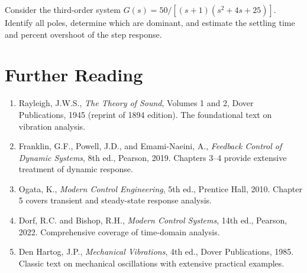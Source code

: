 \begin{exercise}
Consider the third-order system $G(s) = 50/[(s+1)(s^2+4s+25)]$. Identify all poles, determine which are dominant, and estimate the settling time and percent overshoot of the step response.
\end{exercise}

\section{Further Reading}

\begin{enumerate}
    \item Rayleigh, J.W.S., \textit{The Theory of Sound}, Volumes 1 and 2, Dover Publications, 1945 (reprint of 1894 edition). The foundational text on vibration analysis.

    \item Franklin, G.F., Powell, J.D., and Emami-Naeini, A., \textit{Feedback Control of Dynamic Systems}, 8th ed., Pearson, 2019. Chapters 3--4 provide extensive treatment of dynamic response.

    \item Ogata, K., \textit{Modern Control Engineering}, 5th ed., Prentice Hall, 2010. Chapter 5 covers transient and steady-state response analysis.

    \item Dorf, R.C. and Bishop, R.H., \textit{Modern Control Systems}, 14th ed., Pearson, 2022. Comprehensive coverage of time-domain analysis.

    \item Den Hartog, J.P., \textit{Mechanical Vibrations}, 4th ed., Dover Publications, 1985. Classic text on mechanical oscillations with extensive practical examples.
\end{enumerate}

